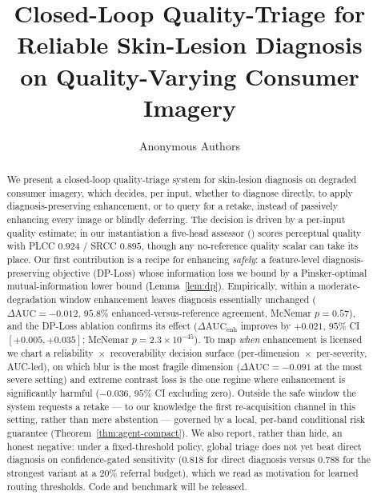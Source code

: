 \documentclass{article}
\title{Closed-Loop Quality-Triage for Reliable Skin-Lesion Diagnosis\\
on Quality-Varying Consumer Imagery}
\author{Anonymous Authors}
\begin{document}
\maketitle

\begin{abstract}
We present a closed-loop quality-triage system for skin-lesion diagnosis on degraded consumer
imagery, which decides, per input, whether to diagnose directly, to apply diagnosis-preserving
enhancement, or to query for a retake, instead of passively enhancing every image or blindly
deferring. The decision is driven by a per-input quality estimate; in our instantiation a five-head
assessor (\visiscore) scores perceptual quality with PLCC $0.924$ / SRCC $0.895$, though any
no-reference quality scalar can take its place. Our first contribution is a recipe for enhancing
\emph{safely}: a feature-level diagnosis-preserving objective (DP-Loss) whose information loss we bound
by a Pinsker-optimal mutual-information lower bound (Lemma~\ref{lem:dp}). Empirically, within a
moderate-degradation window enhancement leaves diagnosis essentially unchanged ($\Delta\mathrm{AUC}=
-0.012$, $95.8\%$ enhanced-versus-reference agreement, McNemar $p=0.57$), and the DP-Loss ablation
confirms its effect ($\Delta\mathrm{AUC}_{\text{enh}}$ improves by $+0.021$, $95\%$ CI
$[+0.005,+0.035]$; McNemar $p=2.3\times10^{-45}$). To map \emph{when} enhancement is licensed we chart
a reliability~$\times$~recoverability decision surface (per-dimension~$\times$~per-severity, AUC-led),
on which blur is the most fragile dimension ($\Delta\mathrm{AUC}=-0.091$ at the most severe setting)
and extreme contrast loss is the one regime where enhancement is significantly harmful
($-0.036$, $95\%$ CI excluding zero). Outside the safe window the system requests a retake --- to our
knowledge the first re-acquisition channel in this setting, rather than mere abstention --- governed by
a local, per-band conditional risk guarantee (Theorem~\ref{thm:agent-compact}). We also report,
rather than hide, an honest negative: under a fixed-threshold policy, global triage does not yet beat
direct diagnosis on confidence-gated sensitivity ($0.818$ for direct diagnosis versus $0.788$ for the
strongest variant at a $20\%$ referral budget), which we read as motivation for learned routing
thresholds. Code and benchmark will be released.
\end{abstract}













\end{document}
